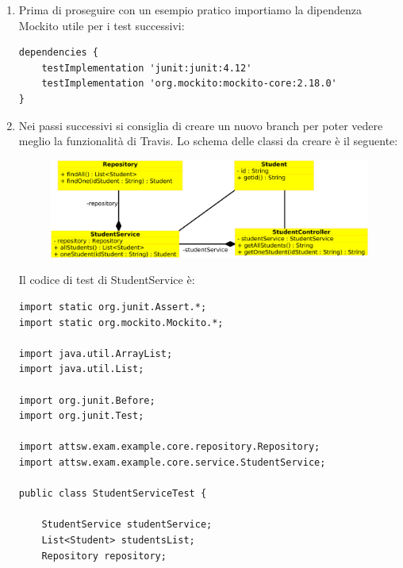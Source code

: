 \begin{enumerate}
\begin{figure}[H]
  \end{figure}
  Cliccandoci si apre una finestra in cui potrete scegliere il branch e la modalità di import, nel nostro caso avremo bisogno del codice markdown che corrisponderà ad una istruzione di questo tipo: 
    \begin{verbatim}
     [![Build Status]
     (https://travis-ci.org/<User>/<gitRepositoryName>.svg?branch=master)]
     (https://travis-ci.org/<User>/<gitRepositoryName>))
  \end{verbatim}
  Copiamo e incolliamo (con le dovute modifiche) direttamente nel README.md ottenendo il risultato mostrato sopra.
  \item Prima di proseguire con un esempio pratico importiamo la dipendenza Mockito utile per i test successivi:
  \begin{lstlisting}[frame=single]
dependencies {
    testImplementation 'junit:junit:4.12'
    testImplementation 'org.mockito:mockito-core:2.18.0'
}\end{lstlisting}
    \item Nei passi successivi si consiglia di creare un nuovo branch per poter vedere meglio la funzionalità di Travis. Lo schema delle classi da creare è il seguente:
    \begin{figure}[H]
    \centering
    \includegraphics[width=0.8\linewidth]{4IntegrationWithOtherTool/tutorial/classDiagram.png}
  \end{figure}
  Il codice di test di StudentService è:
  \begin{lstlisting}[frame=single]
import static org.junit.Assert.*;
import static org.mockito.Mockito.*;

import java.util.ArrayList;
import java.util.List;

import org.junit.Before;
import org.junit.Test;

import attsw.exam.example.core.repository.Repository;
import attsw.exam.example.core.service.StudentService;

public class StudentServiceTest {

	StudentService studentService;
	List<Student> studentsList;
	Repository repository;


\end{lstlisting}
\end{enumerate}

